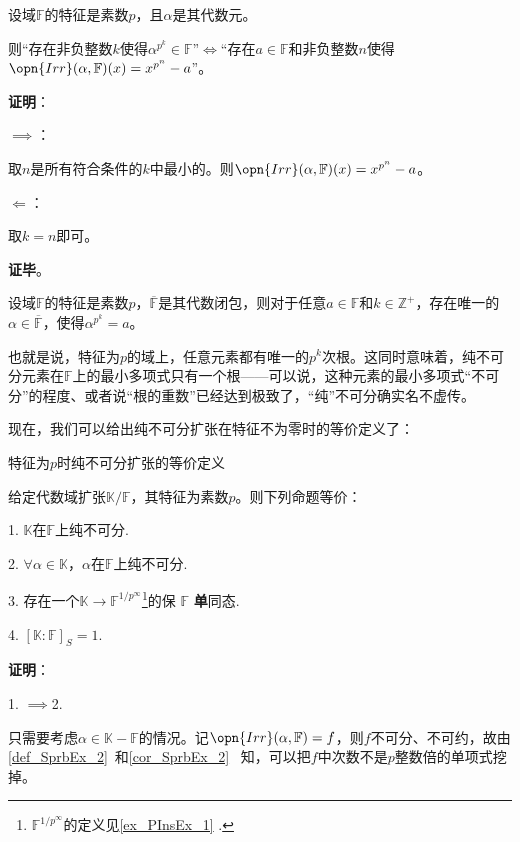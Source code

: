 \begin{lemma}{}
设域$\mathbb{F}$的特征是素数$p$，且$\alpha$是其代数元。

则“存在非负整数$k$使得$\alpha^{p^k}\in\mathbb{F}$”$\iff$“存在$a\in\mathbb{F}$和非负整数$n$使得$\opn{Irr}(\alpha, \mathbb{F})(x) = x^{p^n}-a$”。

\end{lemma}

\textbf{证明}：

$\implies$：

取$n$是所有符合条件的$k$中最小的。则$\opn{Irr}(\alpha, \mathbb{F})(x) = x^{p^n}-a$。

$\Leftarrow$：

取$k=n$即可。

\textbf{证毕}。

\begin{corollary}{}\label{cor_PInsEx_1}
设域$\mathbb{F}$的特征是素数$p$，$\overline{\mathbb{F}}$是其代数闭包，则对于任意$a\in\mathbb{F}$和$k\in\mathbb{Z}^+$，存在唯一的$\alpha\in\overline{\mathbb{F}}$，使得$\alpha^{p^k}=a$。
\end{corollary}

也就是说，特征为$p$的域上，任意元素都有唯一的$p^k$次根。这同时意味着，纯不可分元素在$\mathbb{F}$上的最小多项式只有一个根——可以说，这种元素的最小多项式“不可分”的程度、或者说“根的重数”已经达到极致了，“纯”不可分确实名不虚传。


现在，我们可以给出纯不可分扩张在特征不为零时的等价定义了：




\begin{theorem}{特征为$p$时纯不可分扩张的等价定义}\label{the_PInsEx_1}


给定代数域扩张$\mathbb{K}/\mathbb{F}$，其特征为素数$p$。则下列命题等价：

1. $\mathbb{K}$在$\mathbb{F}$上纯不可分.

2. $\forall \alpha\in\mathbb{K}$，$\alpha$在$\mathbb{F}$上纯不可分.

3. 存在一个$\mathbb{K}\to\mathbb{F}^{1/p^\infty}$\footnote{$\mathbb{F}^{1/p^\infty}$的定义见\autoref{ex_PInsEx_1} .}的保 $\mathbb{F}$ \textbf{单}同态.

4. $[\mathbb{K}:\mathbb{F}]_S=1$.


\end{theorem}

\textbf{证明}：

1. $\implies$2. 

只需要考虑$\alpha\in\mathbb{K}-\mathbb{F}$的情况。记$\opn{Irr}(\alpha, \mathbb{F})=f$，则$f$不可分、不可约，故由\autoref{def_SprbEx_2}~和\autoref{cor_SprbEx_2}~ 知，可以把$f$中次数不是$p$整数倍的单项式挖掉。

